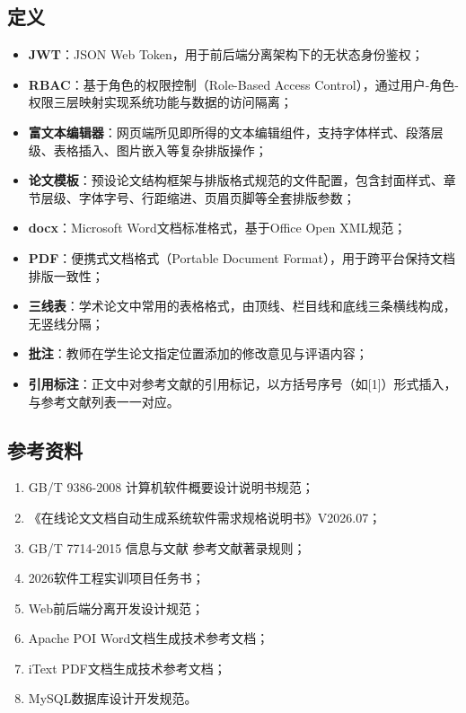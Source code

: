 \documentclass{../template/softeng}
\begin{document}
\subsection{定义}
\begin{itemize}
	\item \textbf{JWT}：JSON Web Token，用于前后端分离架构下的无状态身份鉴权；
	\item \textbf{RBAC}：基于角色的权限控制（Role-Based Access Control），通过用户-角色-权限三层映射实现系统功能与数据的访问隔离；
	\item \textbf{富文本编辑器}：网页端所见即所得的文本编辑组件，支持字体样式、段落层级、表格插入、图片嵌入等复杂排版操作；
	\item \textbf{论文模板}：预设论文结构框架与排版格式规范的文件配置，包含封面样式、章节层级、字体字号、行距缩进、页眉页脚等全套排版参数；
	\item \textbf{docx}：Microsoft Word文档标准格式，基于Office Open XML规范；
	\item \textbf{PDF}：便携式文档格式（Portable Document Format），用于跨平台保持文档排版一致性；
	\item \textbf{三线表}：学术论文中常用的表格格式，由顶线、栏目线和底线三条横线构成，无竖线分隔；
	\item \textbf{批注}：教师在学生论文指定位置添加的修改意见与评语内容；
	\item \textbf{引用标注}：正文中对参考文献的引用标记，以方括号序号（如[1]）形式插入，与参考文献列表一一对应。
\end{itemize}

\subsection{参考资料}
\begin{enumerate}
	\item GB/T 9386-2008 计算机软件概要设计说明书规范；
	\item 《在线论文文档自动生成系统软件需求规格说明书》V2026.07；
	\item GB/T 7714-2015 信息与文献 参考文献著录规则；
	\item 2026软件工程实训项目任务书；
	\item Web前后端分离开发设计规范；
	\item Apache POI Word文档生成技术参考文档；
	\item iText PDF文档生成技术参考文档；
	\item MySQL数据库设计开发规范。
\end{enumerate}
\end{document}
